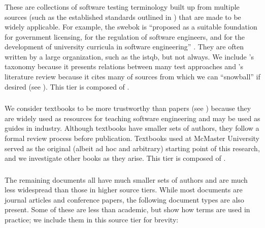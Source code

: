 \subsubsection{}
\label{metas}

These are collections of software testing terminology built up from multiple
sources (such as the established standards outlined in ) that are
made to be widely applicable. For example, the \acs{swebok} is ``proposed as a
suitable foundation for government licensing, for the regulation of software
engineers, and for the development of university curricula in software
engineering'' \citep[p.~xix]{KanerEtAl2011}. They are often written by a large
organization, such as the \acf{istqb}, but not always. We include
\citeauthor{Firesmith2015}'s taxonomy
\citeyearpar{Firesmith2015} because it presents relations between many test
approaches and \citeauthor{DoğanEtAl2014}'s
literature review \citeyearpar{DoğanEtAl2014} because it cites many
of sources from which we can ``snowball'' if desired (see ).
This tier is composed of .

\subsubsection{}
\label{texts}

We consider textbooks to be more trustworthy than papers (see )
because they are widely used as resources for teaching software engineering and
may be used as guides in industry.
Although textbooks have smaller sets of
authors, they follow a formal review process before publication. Textbooks used
at McMaster University \citep{Patton2006,PetersAndPedrycz2000,vanVliet2000}
served as the original (albeit ad hoc and arbitrary) starting point of this
research, and we investigate other books as they arise. \addTextEx{}
This tier is composed of .

\subsubsection{}
\label{papers}

The remaining documents all have much smaller sets of authors and are much less
widespread than those in higher source tiers. While most documents are
journal articles and conference papers, the following document types are also
present. Some of these are less than academic, but show how terms are used in
practice; we include them in this source tier for brevity:

